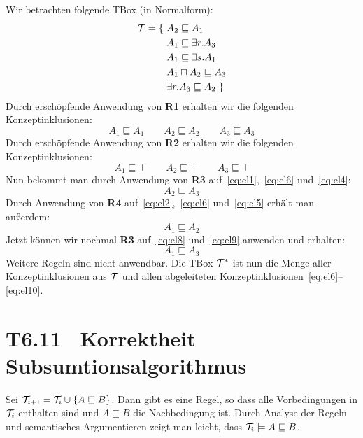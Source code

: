 \documentclass[fontsize=11pt, twoside=false, numbers=autoenddot]{scrbook}
\begin{document}
Wir betrachten folgende TBox (in Normalform): 
%
\begin{align}
  \mathcal{T} = \{\ & A_2\sqsubseteq A_1 \label{eq:el1}\\
  & A_1\sqsubseteq \exists r.A_3  \label{eq:el2}\\
  & A_1\sqsubseteq \exists s.A_1 \label{eq:el3}\\
  & A_1\sqcap A_2\sqsubseteq A_3  \label{eq:el4}\\
  & \exists r.A_3 \sqsubseteq A_2 \  \label{eq:el5}\}
\end{align}
%
Durch erschöpfende Anwendung von \textbf{\textsf{R1}} erhalten wir die
folgenden Konzeptinklusionen: 
%
\begin{equation}
  A_1\sqsubseteq A_1 \qquad A_2\sqsubseteq A_2\qquad A_3\sqsubseteq
  A_3 \label{eq:el6}
\end{equation}
%
Durch erschöpfende Anwendung von \textbf{\textsf{R2}} erhalten wir die
folgenden Konzeptinklusionen: 
%
\begin{equation}
  A_1\sqsubseteq \top \qquad A_2\sqsubseteq \top\qquad A_3\sqsubseteq
  \top \label{eq:el7}
\end{equation}
%
Nun bekommt man durch Anwendung von \textbf{\textsf{R3}}
auf~\eqref{eq:el1},~\eqref{eq:el6} und~\eqref{eq:el4}: 
%
\begin{equation}
  A_2\sqsubseteq A_3 \label{eq:el8} \end{equation}
%
Durch Anwendung von \textbf{\textsf{R4}}
auf~\eqref{eq:el2},~\eqref{eq:el6} und~\eqref{eq:el5} erhält man
außerdem:
%
\begin{equation}
  A_1\sqsubseteq A_2 \label{eq:el9}
\end{equation}
%
Jetzt können wir nochmal \textbf{\textsf{R3}} auf~\eqref{eq:el8}
und~\eqref{eq:el9} anwenden und erhalten:
%
\begin{equation}
  A_1\sqsubseteq A_3 \label{eq:el10}
\end{equation}
%
Weitere Regeln sind nicht anwendbar.  Die TBox $\mathcal{T}^*$ ist nun die
Menge aller Konzeptinklusionen aus $\mathcal{T}$ und allen abgeleiteten
Konzeptinklusionen~\eqref{eq:el6}--\eqref{eq:el10}.

\section*{T6.11~ Korrektheit Subsumtionsalgorithmus}

Sei $\mathcal{T}_{i+1}=\mathcal{T}_i\cup \{A\sqsubseteq B\}$. Dann gibt es eine
Regel, so dass alle Vorbedingungen in $\mathcal{T}_i$ enthalten sind und
$A\sqsubseteq B$ die Nachbedingung ist. Durch Analyse der Regeln und
semantisches Argumentieren zeigt man leicht, dass $\mathcal{T}_{i}\models
A\sqsubseteq B$.
\end{document}
